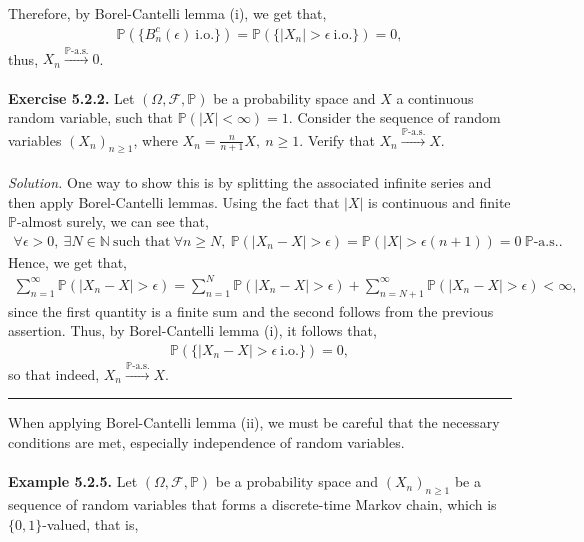 \documentclass{article}
\begin{document}
Therefore, by Borel-Cantelli lemma (i), we get that,
\begin{eqnarray}
\nonumber
\mathbb{P}(\{B_n^c(\epsilon) \ \text{i.o.}\}) = \mathbb{P}(\{|X_n| > \epsilon \ \text{i.o.}\}) = 0,
\end{eqnarray}
thus, $X_n \xrightarrow{\mathbb{P}\text{-a.s.}} 0$.\\\\
\textbf{Exercise 5.2.2.} Let $(\Omega,\mathcal{F},\mathbb{P})$ be a probability space and $X$ a continuous random variable, such that $\mathbb{P}(|X| < \infty) = 1$. Consider the sequence of random variables $(X_n)_{n\geq1}$, where $X_n = \frac{n}{n+1}X, \ n\geq1$. Verify that $X_n \xrightarrow{\mathbb{P}\text{-a.s.}} X$.\\\\
\textit{Solution.} One way to show this is by splitting the associated infinite series and then apply Borel-Cantelli lemmas. Using the fact that $|X|$ is continuous and finite $\mathbb{P}$-almost surely, we can see that,
\begin{eqnarray}
\nonumber
\forall \epsilon > 0, \ \exists N \in \mathbb{N} \ \text{such that} \ \forall n \geq N, \ \mathbb{P}(|X_n - X| > \epsilon) = \mathbb{P}(|X| > \epsilon(n+1)) = 0 \ \mathbb{P}\text{-a.s.}.
\end{eqnarray}
Hence, we get that,
\begin{eqnarray}
\nonumber
\sum_{n=1}^{\infty}\mathbb{P}(|X_n - X| > \epsilon) = \sum_{n=1}^{N}\mathbb{P}(|X_n - X| > \epsilon) + \sum_{n=N+1}^{\infty}\mathbb{P}(|X_n - X| > \epsilon) < \infty,
\end{eqnarray}
since the first quantity is a finite sum and the second follows from the previous assertion. Thus, by Borel-Cantelli lemma (i), it follows that,
\begin{eqnarray}
\nonumber
\mathbb{P}(\{|X_n - X| > \epsilon \ \text{i.o.}\}) = 0,
\end{eqnarray}
so that indeed, $X_n \xrightarrow{\mathbb{P}\text{-a.s.}} X$.
\begin{center}
	\noindent\rule{12cm}{0.4pt}
\end{center}
When applying Borel-Cantelli lemma (ii), we must be careful that the necessary conditions are met, especially independence of random variables.\\\\
\textbf{Example 5.2.5.} Let $(\Omega,\mathcal{F},\mathbb{P})$ be a probability space and $(X_n)_{n\geq1}$ be a sequence of random variables that forms a discrete-time Markov chain, which is $\{0,1\}$-valued, that is,
\end{document}
